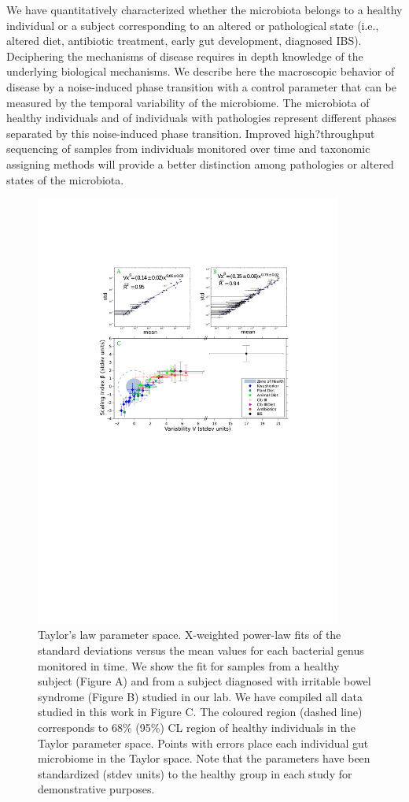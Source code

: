 We have quantitatively characterized whether the microbiota belongs to a healthy individual or a subject corresponding to an altered or pathological state (i.e., altered diet, antibiotic treatment, early gut development, diagnosed IBS). Deciphering the mechanisms of disease requires in depth knowledge of the underlying biological mechanisms. We describe here the macroscopic behavior of disease by a noise-induced phase transition with a control parameter that can be measured by the temporal variability of the microbiome. The microbiota of healthy individuals and of individuals with pathologies represent different phases separated by this noise-induced phase transition. Improved high?throughput sequencing of samples from individuals monitored over time and taxonomic assigning methods will provide a better distinction among pathologies or altered states of the microbiota.

\begin{figure}
\includegraphics[width=0.9\textwidth]{results/comboplot1.pdf}
\caption{Taylor's law parameter space. X-weighted power-law fits of the standard deviations versus the mean values for each bacterial genus monitored in time. We show the fit for samples from a healthy subject (Figure A) and from a subject diagnosed with irritable bowel syndrome (Figure B) studied in our lab\cite{durban}. We have compiled all data studied in this work in Figure C. The coloured region (dashed line) corresponds to 68\% (95\%) CL region of healthy individuals in the Taylor parameter space. Points with errors place each individual gut microbiome in the Taylor space. Note that the parameters have been standardized (stdev units) to the healthy group in each study for demonstrative purposes.}
\end{figure}


